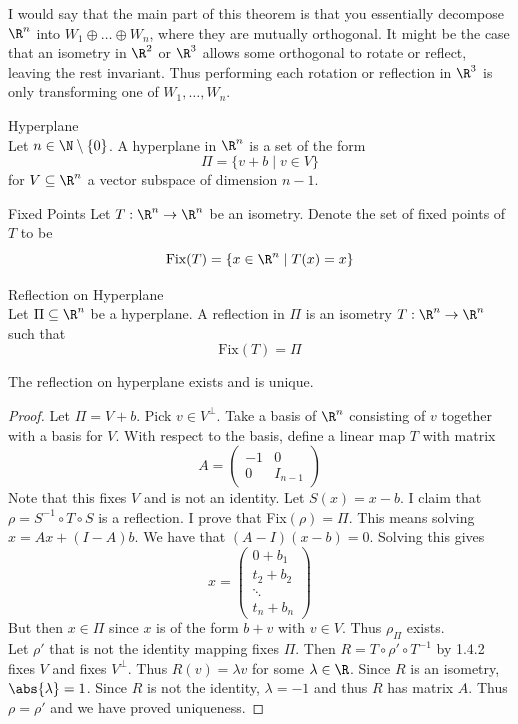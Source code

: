 \documentclass[a4paper]{article}
\begin{document}
I would say that the main part of this theorem is that you essentially decompose $\R^n$ into $W_1\oplus\dots\oplus W_n$, where they are mutually orthogonal. It might be the case that an isometry in $\R^2$ or $\R^3$ allows some orthogonal to rotate or reflect, leaving the rest invariant. Thus performing each rotation or reflection in $\R^3$ is only transforming one of $W_1,\dots,W_n$. 

\begin{defn}{Hyperplane}{}\\
Let $n\in\N\setminus\{0\}$. A hyperplane in $\R^n$ is a set of the form $$\Pi=\{v+b\;|\;v\in V\}$$ for $V\subseteq\R^n$ a vector subspace of dimension $n-1$. 
\end{defn}

\begin{defn}{Fixed Points}{} Let $T:\R^n\to\R^n$ be an isometry. Denote the set of fixed points of $T$ to be $$\text{Fix}(T)=\{x\in\R^n\;|\;T(x)=x\}$$
\end{defn}

\begin{defn}{Reflection on Hyperplane}{}\\
Let $\Pi\subseteq\R^n$ be a hyperplane. A reflection in $\Pi$ is an isometry $T:\R^n\to\R^n$ such that $$\text{Fix}(T)=\Pi$$
\end{defn}

\begin{prp}{}{} The reflection on hyperplane exists and is unique. 
\begin{proof} Let $\Pi=V+b$. Pick $v\in V^\perp$. Take a basis of $\R^n$ consisting of $v$ together with a basis for $V$. With respect to the basis, define a linear map $T$ with matrix $$A=\begin{pmatrix}
-1 & 0\\
0 & I_{n-1}
\end{pmatrix}$$
Note that this fixes $V$ and is not an identity. Let $S(x)=x-b$. I claim that $\rho=S^{-1}\circ T\circ S$ is  a reflection. I prove that Fix$(\rho)=\Pi$. This means solving $x=Ax+(I-A)b$. We have that $(A-I)(x-b)=0$. Solving this gives $$x=\begin{pmatrix}
0+b_1\\
t_2+b_2\\
\ddots\\
t_n+b_n
\end{pmatrix}$$
But then $x\in\Pi$ since $x$ is of the form $b+v$ with $v\in V$. Thus $\rho_\Pi$ exists. \\
Let $\rho'$ that is not the identity mapping fixes $\Pi$. Then $R=T\circ\rho'\circ T^{-1}$ by 1.4.2 fixes $V$ and fixes $V^\perp$. Thus $R(v)=\lambda v$ for some $\lambda\in\R$. Since $R$ is an isometry, $\abs{\lambda}=1$. Since $R$ is not the identity, $\lambda=-1$ and thus $R$ has matrix $A$. Thus $\rho=\rho'$ and we have proved uniqueness. 
\end{proof}
\end{prp}
\end{document}
